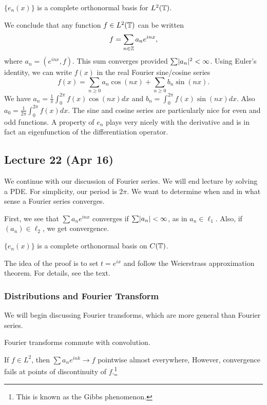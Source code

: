 \documentclass[10pt, twoside]{article}
\begin{document}
    \begin{prop}
        $\{e_n(x)\}$ is a complete orthonormal basis for $L^2(\mathbb{T})$.
    \end{prop}

    We conclude that any function $f \in L^2(\mathbb{T})$ can be written \[f = \sum_{n \in \mathbb{Z}} a_n e^{inx},\] where $a_n = (e^{inx},f)$. This sum converges provided $\sum \lvert a_n\rvert^2 < \infty$. Using Euler's identity, we can write $f(x)$ in the real Fourier sine/cosine series \[f(x) = \sum_{n \geq 0} a_n \cos(nx) + \sum_{n \geq 0} b_n \sin(nx).\]
    We have $a_n = \frac{1}{\pi} \int_0^{2\pi} f(x) \cos(nx) d x$ and $b_n = \int_0^{2\pi} f(x) \sin(nx) dx$. Also $a_0 = \frac{1}{2\pi} \int_0^{2\pi} f(x) dx$. The sine and cosine series are particularly nice for even and odd functions. A property of $e_n$ plays very nicely with the derivative and is in fact an eigenfunction of the differentiation operator.

    \subsection{Lecture 22 (Apr 16)}
    We continue with our discussion of Fourier series. We will end lecture by solving a PDE. For simplicity, our period is $2 \pi$. We want to determine when and in what sense a Fourier series converges.

    First, we see that $\sum a_n e^{inx}$ converges if $\sum \lvert a_n\rvert < \infty$, as in $a_n \in \ell_1$. Also, if $(a_n) \in \ell_2$, we get convergence.

    \begin{prop}
        $\{e_n(x)\}$ is a complete orthonormal basis on $C(\mathbb{T})$.
    \end{prop}
    The idea of the proof is to set $t=e^{ix}$ and follow the Weierstrass approximation theorem. For details, see the text.
    
    \subsubsection{Distributions and Fourier Transform}
    We will begin discussing Fourier transforms, which are more general than Fourier series.
    
    \begin{rmk}
        Fourier transforms commute with convolution.
    \end{rmk}

    \begin{thm}[Carleson, 1966]
        If $f \in L^2$, then $\sum a_n e^{ink} \to f$ pointwise almost everywhere, However, convergence fails at points of discontinuity of $f$.\footnote{This is known as the Gibbs phenomenon.}
    \end{thm}
\end{document}
